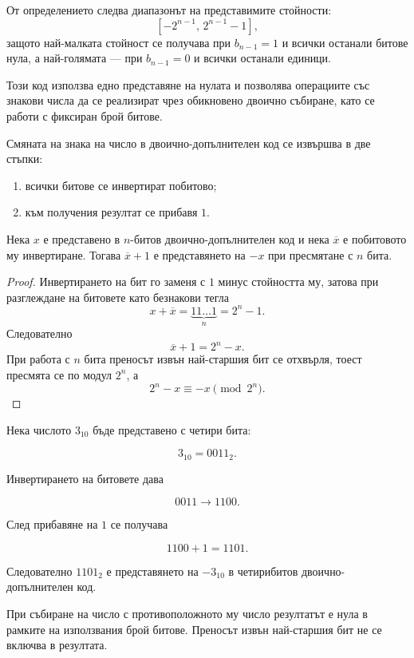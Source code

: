 От определението следва диапазонът на представимите стойности:
\[
[-2^{n-1},\,2^{n-1}-1],
\]
защото най-малката стойност се получава при $b_{n-1}=1$ и всички останали битове нула, а най-голямата --- при $b_{n-1}=0$ и всички останали единици.

Този код използва едно представяне на нулата и позволява операциите със знакови числа да се реализират чрез обикновено двоично събиране, като се работи с фиксиран брой битове.

Смяната на знака на число в двоично-допълнителен код се извършва в две стъпки:

\begin{enumerate}
    \item всички битове се инвертират побитово;
    \item към получения резултат се прибавя $1$.
\end{enumerate}

\begin{prop}
Нека $x$ е представено в $n$-битов двоично-допълнителен код и нека $\overline{x}$ е побитовото му инвертиране. Тогава $\overline{x}+1$ е представянето на $-x$ при пресмятане с $n$ бита.
\end{prop}

\begin{proof}
Инвертирането на бит го заменя с $1$ минус стойността му, затова при разглеждане на битовете като безнакови тегла
\[
x+\overline{x}=\underbrace{11\ldots1}_{n}=2^n-1 .
\]
Следователно
\[
\overline{x}+1=2^n-x .
\]
При работа с $n$ бита преносът извън най-старшия бит се отхвърля, тоест пресмята се по модул $2^n$, а
\[
2^n-x\equiv -x \pmod{2^n}.
\]
\end{proof}

\begin{example}
Нека числото $3_{10}$ бъде представено с четири бита:

\[
3_{10}=0011_2.
\]

Инвертирането на битовете дава

\[
0011 \longrightarrow 1100.
\]

След прибавяне на $1$ се получава

\[
1100+1=1101.
\]

Следователно $1101_2$ е представянето на $-3_{10}$ в четирибитов двоично-допълнителен код.
\end{example}

При събиране на число с противоположното му число резултатът е нула в рамките на използвания брой битове. Преносът извън най-старшия бит не се включва в резултата.

